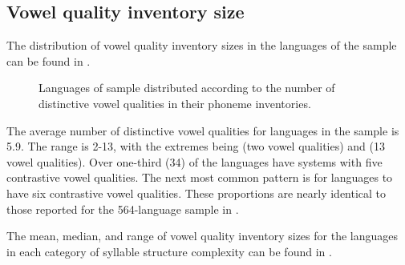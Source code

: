 \subsection{Vowel quality inventory size}\label{sec:4.3.1}

  The distribution of vowel quality inventory sizes in the languages of the sample can be found in .


\begin{figure}
\caption{\label{fig:4.1}Languages of sample distributed according to the number of distinctive vowel qualities in their phoneme inventories.}
\end{figure}

  The average number of distinctive vowel qualities for languages in the sample is 5.9. The range is 2-13, with the extremes being  (two vowel qualities) and  (13 vowel qualities). Over one-third (34) of the languages have systems with five contrastive vowel qualities. The next most common pattern is for languages to have six contrastive vowel qualities. These proportions are nearly identical to those reported for the 564-language sample in \citet{Maddieson2013c}.

  The mean, median, and range of vowel quality inventory sizes for the languages in each category of syllable structure complexity can be found in .

